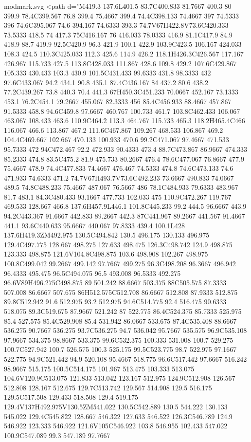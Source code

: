 \begin{filecontents}[noheader]{modmark.svg}
	<path d="M419.3 137.6L401.5 83.7C400.833 81.7667 400.3 80 399.9 78.4C399.567 76.8 399.4 75.4667 399.4 74.4C398.133 74.4667 397 74.5333 396 74.6C395.067 74.6 394.167 74.6333 393.3 74.7V67H422.8V73.6C420.333 73.5333 418.5 74 417.3 75C416.167 76 416.033 78.0333 416.9 81.1C417.9 84.9 418.9 88.7 419.9 92.5C420.9 96.3 421.9 100.1 422.9 103.9C423.5 106.167 424.033 108.3 424.5 110.3C425.033 112.3 425.6 114.9 426.2 118.1H426.3C426.567 117.167 426.967 115.733 427.5 113.8C428.033 111.867 428.6 109.8 429.2 107.6C429.867 105.333 430.433 103.3 430.9 101.5C431.433 99.6333 431.8 98.3333 432 97.6C433.067 94.2 434.1 90.8 435.1 87.4C436.167 84 437.2 80.6 438.2 77.2C439.267 73.8 440.3 70.4 441.3 67H450.3C451.233 70.0667 452.167 73.1333 453.1 76.2C454.1 79.2667 455.067 82.3333 456 85.4C456.933 88.4667 457.867 91.5333 458.8 94.6C459.8 97.6667 460.767 100.733 461.7 103.8C462.433 106.067 463.067 108.433 463.6 110.9C464.2 113.3 464.767 115.733 465.3 118.2H465.4C466 116.067 466.6 113.867 467.2 111.6C467.867 109.267 468.533 106.867 469.2 104.4C469.667 102.667 470.133 100.933 470.6 99.2C471.067 97.4667 471.533 95.7333 472 94C472.467 92.2 472.933 90.4333 473.4 88.7C473.867 86.9667 474.333 85.2333 474.8 83.5C475.2 81.9 475.733 80.2667 476.4 78.6C477.067 76.8667 477.9 75.4667 478.9 74.4C477.833 74.4667 476.467 74.5333 474.8 74.6C473.133 74.6 471.933 74.6333 471.2 74.7V67H493.7V73.6C492.233 73.6667 490.833 74.0667 489.5 74.8C488.233 75.4667 487.067 76.5667 486 78.1C484.933 79.6333 483.967 81.7 483.1 84.3C480.433 93.1667 477.733 102.033 475 110.9C472.267 119.767 469.533 128.667 466.8 137.6H457.9L446.1 101.8C445.233 99.2 444.5 96.6667 443.9 94.2C443.367 91.6667 442.833 89.2667 442.3 87C441.967 89.2667 441.567 91.4667 441.1 93.6C440.633 95.6667 440.067 97.8333 439.4 100.1L428 137.6H419.3ZM492.975 130.5C494.842 130.5 496.175 130.133 496.975 129.4C497.775 128.667 498.275 127.633 498.475 126.3C498.742 124.9 498.875 123.333 498.875 121.6V104.8C498.875 103.6 498.908 102.267 498.975 100.8C499.042 99.2667 499.142 97.7667 499.275 96.3C498.208 96.3667 496.942 96.4333 495.475 96.5C494.075 96.5 493.008 96.5333 492.275 96.6V89H496.275C498.875 89 501.242 88.6667 503.375 88C505.575 87.3333 507.008 86.6667 507.675 86H512.575C512.708 86.6667 512.808 87.9333 512.875 89.8C512.942 91.6 512.975 93.2 512.975 94.6C514.775 92.4 516.475 90.6333 518.075 89.3C519.675 87.9667 521.242 87 522.775 86.4C524.375 85.7333 525.975 85.4 527.575 85.4C529.908 85.4 531.942 86.0667 533.675 87.4C535.408 88.6667 536.275 90.7667 536.275 93.7C536.275 94.7 536.042 95.7667 535.575 96.9C535.108 97.9667 534.375 98.8667 533.375 99.6C532.375 100.333 531.008 100.7 529.275 100.7C527.942 100.7 526.575 100.3 525.175 99.5C523.775 98.7 522.975 97.1667 522.775 94.9C521.442 94.9 520.108 95.4667 518.775 96.6C517.442 97.6667 516.242 98.9667 515.175 100.5C514.175 101.967 513.475 103.333 513.075 104.6V120.9C513.075 121.833 513.042 123.167 512.975 124.9C512.908 126.567 512.808 128.167 512.675 129.7C513.742 129.567 514.908 129.5 516.175 129.5C517.508 129.433 518.508 129.4 519.175 129.4V137H492.975V130.5ZM541.022 130.5C542.889 130.5 544.222 130.133 545.022 129.4C545.822 128.667 546.322 127.633 546.522 126.3C546.789 124.9 546.922 123.333 546.922 121.6V105C546.922 103.8 546.955 102.433 547.022 100.9C547.089 99.3 547.189 97.7667 
\end{filecontents}
